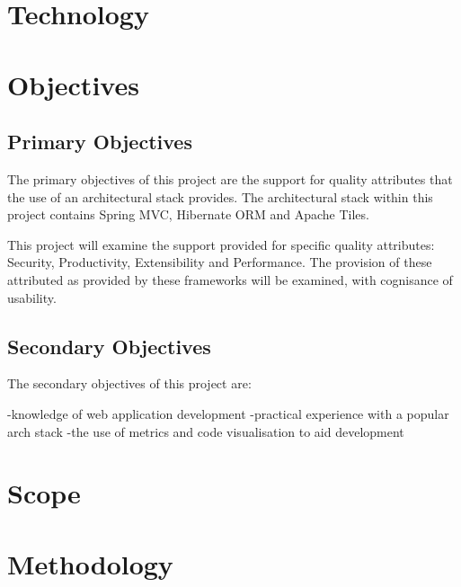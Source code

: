 \section{Technology}

\section{Objectives}

\subsection{Primary Objectives}

The primary objectives of this project are the support for quality attributes that the use of an architectural stack provides. The architectural stack within this project contains Spring MVC, Hibernate ORM and Apache Tiles. 

This project will examine the support provided for specific quality attributes: Security, Productivity, Extensibility and Performance. The provision of these attributed as provided by these frameworks will be examined, with cognisance of usability. 

\subsection{Secondary Objectives}

The secondary objectives of this project are: 

-knowledge of web application development
-practical experience with a popular arch stack
-the use of metrics and code visualisation to aid development

\section{Scope}

\section{Methodology}

\
